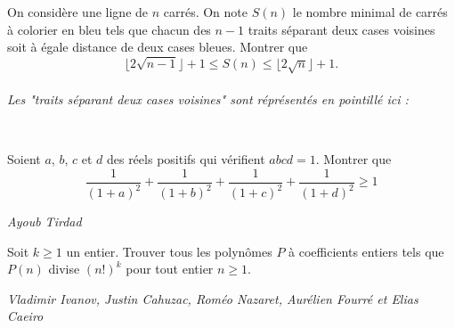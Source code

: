 \begin{exo}{}On considère une ligne de $n$ carrés. On note $S(n)$ le nombre minimal de carrés à colorier en bleu
tels que chacun des $n-1$ traits séparant deux cases voisines soit à égale distance de deux cases
bleues. Montrer que
$$ \lfloor 2 \sqrt {n-1} \rfloor+1 \leq S(n) \leq \lfloor 2 \sqrt {n} \rfloor +1.$$
~~\\
\textit{Les "traits séparant deux cases voisines" sont réprésentés en pointillé ici : }
\\

\end{exo}


\begin{exo}{}
Soient $a$, $b$, $c$ et $d$ des réels positifs qui vérifient $abcd=1$. Montrer que
$$ \dfrac{1}{(1+a)^2} + \dfrac{1}{(1+b)^2} + \dfrac{1}{(1+c)^2} + \dfrac{1}{(1+d)^2} \geq 1$$

\medskip
\textit{Ayoub Tirdad}
\end{exo}

\begin{exo}{}Soit $k \geq 1$ un entier. Trouver tous les polynômes $P$ à coefficients entiers tels que $P(n)$ divise $(n!)^{k}$ pour tout entier $n \geq 1$.

\medskip
\textit{Vladimir Ivanov, Justin Cahuzac, Roméo Nazaret, Aurélien Fourré et Elias Caeiro}
\end{exo}




